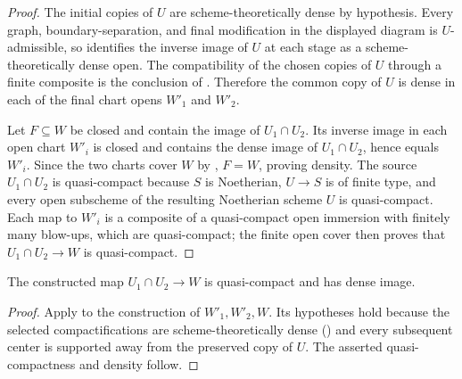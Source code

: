\begin{proof}
  \leanok
  The initial copies of $U$ are scheme-theoretically dense by hypothesis.
  Every graph, boundary-separation, and final modification in the displayed
  diagram is $U$-admissible, so
   identifies the
  inverse image of $U$ at each stage as a scheme-theoretically dense open.
  The compatibility of the chosen copies of $U$ through a finite composite is
  the conclusion of
  .  Therefore the common copy of
  $U$ is dense in each of the final chart opens $W'_1$ and $W'_2$.

  Let $F\subseteq W$ be closed and contain the image of
  $U_1\cap U_2$.  Its inverse image in each open chart $W'_i$ is closed and
  contains the dense image of $U_1\cap U_2$, hence equals $W'_i$.  Since the
  two charts cover $W$ by
  , $F=W$, proving density.
  The source $U_1\cap U_2$ is quasi-compact because $S$ is Noetherian,
  $U\to S$ is of finite type, and every open subscheme of the resulting
  Noetherian scheme $U$ is quasi-compact.  Each map to $W'_i$ is a composite
  of a quasi-compact open
  immersion with finitely many blow-ups, which are quasi-compact; the finite
  open cover then proves that $U_1\cap U_2\to W$ is quasi-compact.
\end{proof}

\begin{lemma}
  \label{lemma:nagata-final-density}
  \leanok

  The constructed map $U_1\cap U_2\to W$ is quasi-compact and has dense
  image.
\end{lemma}

\begin{proof}
  \leanok
  Apply  to the construction of
  $W'_1,W'_2,W$.  Its hypotheses hold because the selected compactifications
  are scheme-theoretically dense
  () and every subsequent
  center is supported
  away from the preserved copy of $U$.  The asserted quasi-compactness and
  density follow.
\end{proof}

